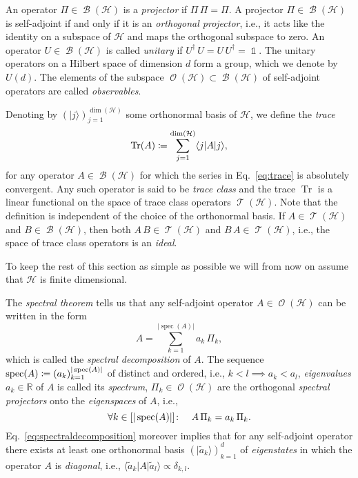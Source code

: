 \documentclass[a4paper,12pt,listof=totoc,index=totoc,bibliography=totoc,headsepline=false,headings=normal,BCOR16.153846mm,DIV12,headinclude,twoside,cleardoublepage=empty,numbers=noenddot,final]{scrreprt}
\theoremstyle{mystyle}
\numberwithin{equation}{section}
\numberwithin{figure}{section}
\numberwithin{lemma}{section}
\numberwithin{theorem}{section}
\numberwithin{corollary}{section}
\numberwithin{definition}{section}
\numberwithin{conjecture}{section}
\numberwithin{observation}{section}
\newcommand{\+}{\mkern2mu}
\newcommand{\coloneqq}{\mathrel{\vcentcolon\mkern-1.2mu=}} %
\newcommand{\texteqref}[1]{Eq.~\eqref{#1}}
\newcommand{\itholds}{\colon\mathchoice{\quad}{}{}{}}
\newcommand{\bra}[1]{\langle #1|}
\newcommand{\ket}[1]{|#1\rangle}
\newcommand{\ad}{^\dagger}
\DeclareMathOperator{\1}{\mathds{1}}
\DeclareMathOperator{\Bop}{\mathcal{B}}
\DeclareMathOperator{\Tcl}{\mathcal{T}}
\DeclareMathOperator{\Obs}{\mathcal{O}}
\DeclareMathOperator{\Tr}{Tr}
\DeclareMathOperator{\spec}{spec}
\newcommand{\mc}[1]{\mathcal{#1}}
\newcommand{\mcH}{\mc{H}}
\newcommand{\mb}[1]{\mathbb{#1}}
\newcommand{\R}{\mb{R}}
\begin{document}
An operator $\Pi \in \Bop(\mcH)$ is a \emph{projector} if $\Pi\,\Pi = \Pi$.
A projector $\Pi \in \Bop(\mcH)$ is self-adjoint if and only if it is an \emph{orthogonal projector}, i.e., it acts like the identity on a subspace of $\mcH$ and maps the orthogonal subspace to zero.
An operator $U \in \Bop(\mcH)$ is called \emph{unitary} if $U\ad\,U = U\,U\ad = \1$.
The unitary operators on a Hilbert space of dimension $d$ form a group, which we denote by $U(d)$.
The elements of the subspace $\Obs(\mcH) \subset \Bop(\mcH)$ of self-adjoint operators are called \emph{observables}.

Denoting by $(\ket j)_{j=1}^{\dim(\mcH)}$ some orthonormal basis of $\mcH$, we define the \emph{trace}
\begin{equation} \label{eq:trace}
  \Tr(A) \coloneqq \sum_{j=1}^{\dim(\mcH)} \bra j A \ket j ,
\end{equation}
for any operator $A \in \Bop(\mcH)$ for which the series in \texteqref{eq:trace} is absolutely convergent.
Any such operator is said to be \emph{trace class} and the trace $\Tr$ is a linear functional on the space of trace class operators $\Tcl(\mcH)$.
Note that the definition is independent of the choice of the orthonormal basis.
If $A \in \Tcl(\mcH)$ and $B \in \Bop(\mcH)$, then both $A\,B \in \Tcl(\mcH)$ and $B\,A \in \Tcl(\mcH)$, i.e., the space of trace class operators is an \emph{ideal}.

To keep the rest of this section as simple as possible we will from now on assume that $\mcH$ is finite dimensional.

The \emph{spectral theorem} tells us that any self-adjoint operator $A \in \Obs(\mcH)$ can be written in the form
\begin{equation} \label{eq:spectraldecomposition}
  A = \sum_{k=1}^{|\spec(A)|} a_k\,\Pi_k ,
\end{equation}
which is called the \emph{spectral decomposition} of $A$.
The sequence $\spec(A) \coloneqq (a_k)_{k=1}^{|\spec(A)|}$ of distinct and ordered, i.e., $k<l \implies a_k < a_l$, \emph{eigenvalues} $a_k \in \R$ of $A$ is called its \emph{spectrum}, $\Pi_k \in \Obs(\mcH)$ are the orthogonal \emph{spectral projectors} onto the \emph{eigenspaces} of $A$, i.e.,
\begin{equation}
  \forall k \in [|\spec(A)|]\itholds A\,\Pi_k = a_k\,\Pi_k .
\end{equation}
\texteqref{eq:spectraldecomposition} moreover implies that for any self-adjoint operator there exists at least one orthonormal basis $(\ket{\tilde{a}_k})_{k=1}^d$ of \emph{eigenstates} in which the operator $A$ is \emph{diagonal}, i.e., $\bra{\tilde{a}_k} A \ket{\tilde{a}_l} \propto \delta_{k,l}$.
\end{document}
